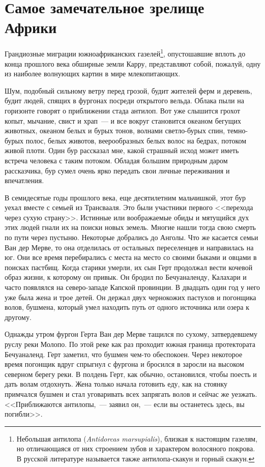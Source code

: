\documentclass[12pt,a4paper,twoside,openany,svgnames]{memoir}
\begin{document}
\chapter{Самое замечательное зрелище Африки}

Грандиозные миграции южноафриканских газелей\footnote{Небольшая антилопа (\textit{Antidorcas marsupialis}), близкая к настоящим газелям, но отличающаяся от них строением зубов и характером волосяного покрова. В русской литературе называется также антилопа-скакун и горный скакун.}, опустошавшие вплоть до конца прошлого века обширные земли Карру, представляют собой, пожалуй, одну из наиболее волнующих картин в мире млекопитающих.

Шум, подобный сильному ветру перед грозой, будит жителей ферм и деревень, будит людей, спящих в фургонах посреди открытого вельда. Облака пыли на горизонте говорят о приближении стада антилоп. Вот уже слышится грохот копыт, мычание, свист и храп~--- и все вокруг становится океаном бегущих животных, океаном белых и бурых тонов, волнами светло-бурых спин, темно-бурых полос, белых животов, веерообразных белых волос на бедрах, потоком живой плоти. Один бур рассказал мне, какой страшный исход может иметь встреча человека с таким потоком. Обладая большим природным даром рассказчика, бур сумел очень ярко передать свои личные переживания и впечатления.

В семидесятые годы прошлого века, еще десятилетним мальчишкой, этот бур уехал вместе с семьей из Трансвааля. Это были участники первого <<перехода через сухую страну>>. Истинные или воображаемые обиды и мятущийся дух этих людей гнали их на поиски новых земель. Многие нашли тогда свою смерть по пути через пустыню. Некоторые добрались до Анголы. Что же касается семьи Ван дер Мерве, то она отделилась от остальных переселенцев и направилась на юг. Они все время перебирались с места на место со своими быками и овцами в поисках пастбищ. Когда старики умерли, их сын Герт продолжал вести кочевой образ жизни, к которому он привык. Он бродил по Бечуаналенду, Калахари и часто появлялся на северо-западе Капской провинции. В двадцать один год у него уже была жена и трое детей. Он держал двух чернокожих пастухов и погонщика волов, бушмена, который умел находить путь от одного источника или озера к другому.

Однажды утром фургон Герта Ван дер Мерве тащился по сухому, затвердевшему руслу реки Молопо. По этой реке как раз проходит южная граница протектората Бечуаналенд. Герт заметил, что бушмен чем-то обеспокоен. Через некоторое время погонщик вдруг спрыгнул с фургона и бросился в заросли на высоком северном берегу реки. В полдень Герт, как обычно, остановился, чтобы поесть и дать волам отдохнуть. Жена только начала готовить еду, как на стоянку примчался бушмен и стал уговаривать всех запрягать волов и сейчас же уезжать. <<Приближаются антилопы,~--- заявил он,~--- если вы останетесь здесь, вы погибли>>.
\end{document}
